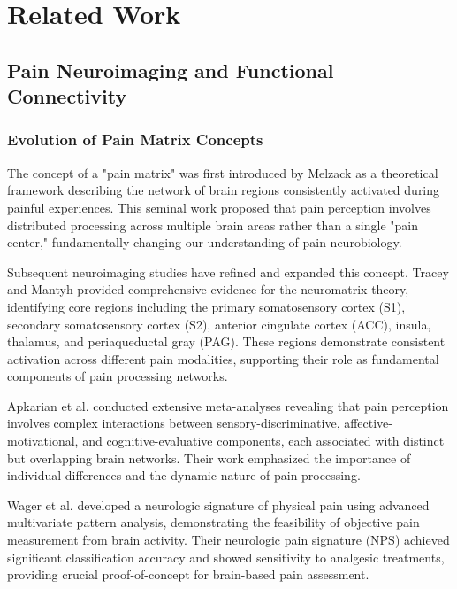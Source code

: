 \documentclass[10pt,journal,compsoc]{IEEEtran}
\begin{document}
\section{Related Work}

\subsection{Pain Neuroimaging and Functional Connectivity}

\subsubsection{Evolution of Pain Matrix Concepts}

The concept of a "pain matrix" was first introduced by Melzack \cite{melzack2001pain} as a theoretical framework describing the network of brain regions consistently activated during painful experiences. This seminal work proposed that pain perception involves distributed processing across multiple brain areas rather than a single "pain center," fundamentally changing our understanding of pain neurobiology.

Subsequent neuroimaging studies have refined and expanded this concept. Tracey and Mantyh \cite{tracey2008neuromatrix} provided comprehensive evidence for the neuromatrix theory, identifying core regions including the primary somatosensory cortex (S1), secondary somatosensory cortex (S2), anterior cingulate cortex (ACC), insula, thalamus, and periaqueductal gray (PAG). These regions demonstrate consistent activation across different pain modalities, supporting their role as fundamental components of pain processing networks.

Apkarian et al. \cite{apkarian2011human} conducted extensive meta-analyses revealing that pain perception involves complex interactions between sensory-discriminative, affective-motivational, and cognitive-evaluative components, each associated with distinct but overlapping brain networks. Their work emphasized the importance of individual differences and the dynamic nature of pain processing.

Wager et al. \cite{wager2013atlas} developed a neurologic signature of physical pain using advanced multivariate pattern analysis, demonstrating the feasibility of objective pain measurement from brain activity. Their neurologic pain signature (NPS) achieved significant classification accuracy and showed sensitivity to analgesic treatments, providing crucial proof-of-concept for brain-based pain assessment.
\end{document}
